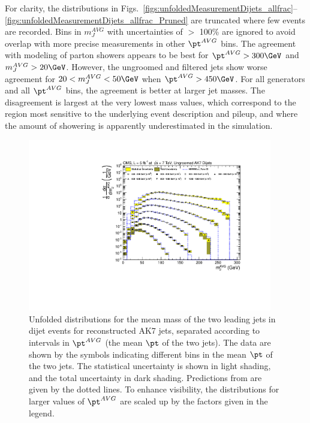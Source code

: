 For clarity, the distributions in 
Figs.~\ref{figs:unfoldedMeasurementDijets_allfrac}--\ref{figs:unfoldedMeasurementDijets_allfrac_Pruned} 
are truncated where few events are recorded.
Bins in $m_J^{AVG}$ with uncertainties of $>$ 100\% are
ignored to avoid overlap with more precise measurements in other
$\pt^{AVG}$ bins. 
The agreement with \HERWIG modeling of parton showers appears to be 
best for $\pt^{AVG}>300\GeV$ and $m_{J}^{AVG}>20\GeV$.
However, the ungroomed and filtered jets show worse agreement 
for $20<m_{J}^{AVG}<50\GeV$ when $\pt^{AVG}>450\GeV$.
For all generators and all $\pt^{AVG}$ bins, the agreement is better
at larger jet masses. The disagreement is largest at the very lowest
mass values, which correspond to the region most sensitive to 
the underlying event description and pileup, 
and where the amount of showering is apparently underestimated in the
simulation. 

%


\begin{figure}[htbp]
\centering
\includegraphics[width=0.95\textwidth]{figs/unfoldedMeasurementDijets_all_}
\caption{Unfolded distributions for the mean mass of the two leading jets in dijet events for reconstructed AK7 jets,
separated according to intervals in $\pt^{AVG}$ (the mean $\pt$ of the two jets).
The data are shown by the symbols indicating different bins in the mean $\pt$ of the two jets. 
The statistical uncertainty is shown in light shading, and the
total uncertainty in dark shading. 
Predictions
from \HERWIG are given by the dotted lines. 
To enhance visibility, the distributions for larger values of $\pt^{AVG}$ 
are scaled up by the factors given in the legend.
\label{figs:unfoldedMeasurementDijets_all}}
\end{figure}

